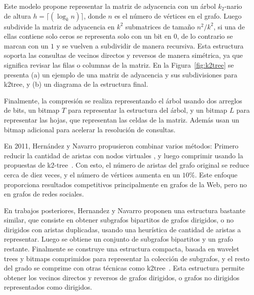 Este modelo propone representar la matriz de adyacencia con un árbol $k_{2}$-nario de altura $h=\lceil(\log_k n)\rceil$, donde $n$ es el número de vértices en el grafo. Luego subdivide la matriz de adyacencia en $k^2$ submatrices de tamaño $n^{2}/k^{2}$, si una de ellas contiene solo ceros se representa solo con un bit en $0$, de lo contrario se marcan con un $1$ y se vuelven a subdividir de manera recursiva. Esta estructura soporta las consultas de vecinos directos y reversos de manera simétrica, ya que significa revisar las filas o columnas de la matriz. En la Figura~\ref{fig:k2tree} se presenta (a) un ejemplo de una matriz de adyacencia y sus subdivisiones para k2tree, y (b) un diagrama de la estructura final.



Finalmente, la compresión se realiza representando el árbol usando dos arreglos de bits, un bitmap $T$ para representar la estructura del árbol, y un bitmap $L$ para representar las hojas, que representan las celdas de la matriz. Además usan un bitmap adicional para acelerar la resolución de consultas. 

En 2011, Hernández y Navarro \cite{hernandez2011compression} propusieron combinar varios métodos: Primero reducir la cantidad de aristas con nodos virtuales \cite{BuehrerChellapilla},  y luego comprimir usando la propuestas de k2-tree~\cite{brisaboa2009k}. Con esto, el número de aristas del grafo original se reduce cerca de diez veces, y el número de vértices aumenta en un $10\%$. Este enfoque proporciona resultados competitivos principalmente en grafos de la Web, pero no en grafos de redes sociales.

En trabajos posteriores, Hernandez y Navarro \cite{hernandez2012compressed, hernandez2014compressed} proponen una estructura bastante similar, que consiste en obtener subgrafos bipartitos de grafos dirigidos, o no dirigidos con aristas duplicadas, usando una heurística de cantidad de aristas a representar. Luego se obtiene un conjunto de subgrafos bipartitos y un grafo restante. Finalmente se construye una estructura compacta, basada en wavelet trees y bitmaps comprimidos para representar la colección de subgrafos, y el resto del grado se comprime con otras técnicas como k2tree~\cite{brisaboa2009k}. Esta estructura permite obtener los vecinos directos y reversos de grafos dirigidos, o grafos no dirigidos representados como dirigidos.


